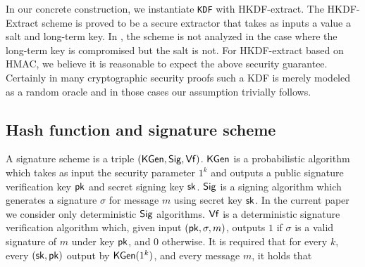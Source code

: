 \documentclass{article}
\begin{document}
In our concrete construction, we instantiate \texttt{KDF} with HKDF-extract. The HKDF-Extract scheme is proved to be a secure extractor that takes as inputs a value a salt and long-term key. In \cite{krawczyk2010cryptographic}, the scheme is not analyzed in the case where the long-term key is compromised but the salt is not. For HKDF-extract based on HMAC, we believe it is reasonable to expect the above security guarantee. Certainly in many cryptographic security proofs such a KDF is merely modeled as a random oracle and in those cases our assumption trivially follows.






\subsection{Hash function and signature scheme}
A signature scheme is a triple $(\mathsf{KGen}, \mathsf{Sig}, \mathsf{Vf})$. $\mathsf{KGen}$ is a probabilistic algorithm which takes as input the security parameter $1^k$ and outputs a public signature verification key $\mathsf{pk}$ and secret signing key $\mathsf{sk}$. $\mathsf{Sig}$ is a signing algorithm which generates a signature $\sigma$ for message $m$ using secret key $\mathsf{sk}$. In the current paper we consider only deterministic $\mathsf{Sig}$ algorithms. $\mathsf{Vf}$ is a deterministic signature verification algorithm which, given input $(\mathsf{pk}, \sigma, m)$, outputs $1$ if $\sigma$ is a valid signature of $m$ under key $\mathsf{pk}$, and $0$ otherwise. It is required that for every $k$, every $(\mathsf{sk}, \mathsf{pk})$ output by $\mathsf{KGen} (1^k)$, and every message $m$, it holds that
\end{document}
